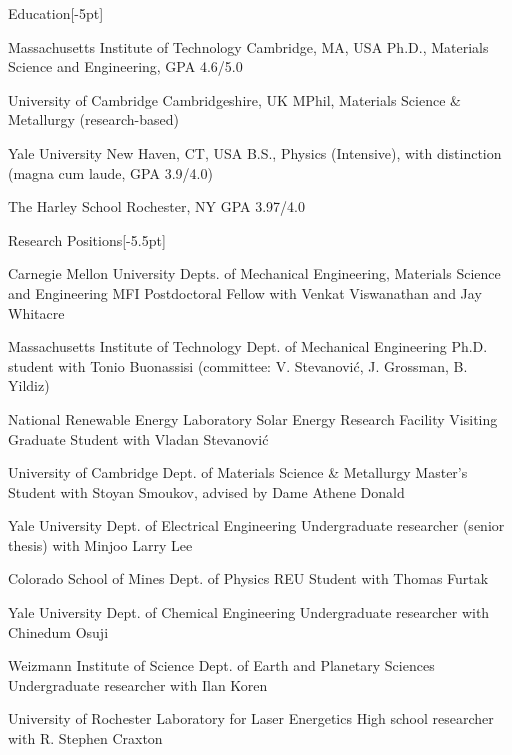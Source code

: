 \documentclass{cv} %
\begin{document}
\thispagestyle{empty}
\begin{cvSection}{Education}[-5pt]

     {Massachusetts Institute of Technology}
     {Cambridge, MA, USA}
     {Ph.D., Materials Science and Engineering, GPA 4.6/5.0}

     {University of Cambridge}
     {Cambridgeshire, UK}
     {MPhil, Materials Science \& Metallurgy (research-based)}

     {Yale University}
     {New Haven, CT, USA}
     {B.S., Physics (Intensive), with distinction (magna cum laude, GPA 3.9/4.0)}

     {The Harley School}
     {Rochester, NY}
     {GPA 3.97/4.0}

\end{cvSection}

\begin{cvSection}{Research Positions}[-5.5pt]

    {Carnegie Mellon University}
    {Depts. of Mechanical Engineering, Materials \newline Science and Engineering}
    {MFI Postdoctoral Fellow with Venkat Viswanathan and Jay Whitacre}

    {Massachusetts Institute of Technology}
    {Dept. of Mechanical Engineering}
    {Ph.D. student with Tonio Buonassisi (committee: V. Stevanovi\'c, J. Grossman, B. Yildiz)}

    {National Renewable Energy Laboratory}
    {Solar Energy Research Facility}
    {Visiting Graduate Student with Vladan Stevanovi\'c}

    {University of Cambridge}
    {Dept. of Materials Science \& Metallurgy}
    {Master's Student with Stoyan Smoukov, advised by Dame Athene Donald}

    {Yale University}
    {Dept. of Electrical Engineering}
    {Undergraduate researcher (senior thesis) with Minjoo Larry Lee}

    {Colorado School of Mines}
    {Dept. of Physics}
    {REU Student with Thomas Furtak}

    {Yale University}
    {Dept. of Chemical Engineering}
    {Undergraduate researcher with Chinedum Osuji}

    {Weizmann Institute of Science}
    {Dept. of Earth and Planetary Sciences}
    {Undergraduate researcher with Ilan Koren}

    {University of Rochester}
    {Laboratory for Laser Energetics}
    {High school researcher with R. Stephen Craxton}

\end{cvSection}
\end{document}
